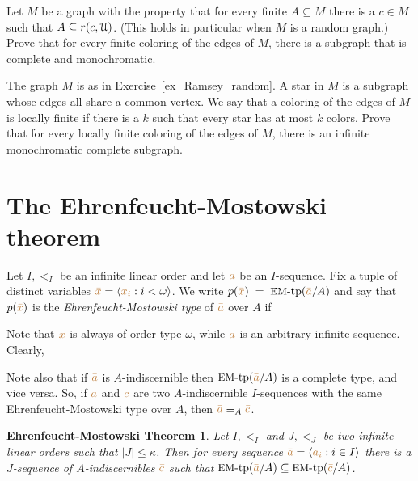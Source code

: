 \begin{exercise}\label{ex_Ramsey_random}
    Let $M$ be a graph with the property that for every finite $A\subseteq M$ there is a $c\in M$ such that $A\subseteq r(c,\EuScript U)$. 
    (This holds in particular when $M$ is a random graph.)
    Prove that for every finite coloring of the edges of $M$, there is a subgraph that is complete and monochromatic.
\end{exercise}

\begin{exercise}
    The graph $M$ is as in Exercise~\ref{ex_Ramsey_random}.
    A star in $M$ is a subgraph whose edges all share a common vertex. We say that a coloring of the edges of $M$ is locally finite if there is a $k$ such that every star has at most $k$ colors.
    Prove that for every locally finite coloring of the edges of $M$, there is an infinite monochromatic complete subgraph.
\end{exercise}

\section{The Ehrenfeucht-Mostowski theorem}\label{EM}

Let $I,<_I$ be an infinite linear order and let ${\color{brown}\bar a}$ be an $I$-sequence.
Fix a tuple of distinct variables ${\color{brown}\bar x}=\langle{\color{brown}x_i}: i<\omega\rangle$.
We write \emph{$p({\color{brown}\bar x})\;=\;\textrm{{\small EM}-tp}({\color{brown}\bar a}/A)$} and say that $p({\color{brown}\bar x})$ is the \emph{Ehren\-feucht-Mostowski type\/} of ${\color{brown}\bar a}$ over $A$ if


Note that ${\color{brown}\bar x}$ is always of order-type $\omega$,
while ${\color{brown}\bar a}$ is an arbitrary infinite sequence.
Clearly,

Note also that if ${\color{brown}\bar a}$ is $A$-indiscernible then $\mbox{{\small EM}-tp}({\color{brown}\bar a}/A)$ is a complete type,
and vice versa.
So,
if ${\color{brown}\bar a}$ and ${\color{brown}\bar c}$ are two $A$-indiscernible $I$-sequences with the same Ehren\-feucht-Mostowski type over $A$,
then ${\color{brown}\bar a}\equiv_A {\color{brown}\bar c}$.

\theoremstyle{mio}
\newtheorem{EhrenfeuchtMostowski}[thm]{Ehrenfeucht-Mostowski Theorem}
\begin{EhrenfeuchtMostowski}\label{thm_EM}
Let $I,<_I$ and $J,<_J$ be two infinite linear orders such that $|J|\le \kappa$.
Then for every sequence ${\color{brown}\bar a}=\langle{\color{brown}a_i}:i\in I\rangle$ there is a $J$-sequence of $A$-indiscernibles ${\color{brown}\bar c}$ such that $\mbox{{\small EM}-tp}({\color{brown}\bar a}/A)\subseteq\mbox{{\small EM}-tp}({\color{brown}\bar c}/A)$.
\end{EhrenfeuchtMostowski}

